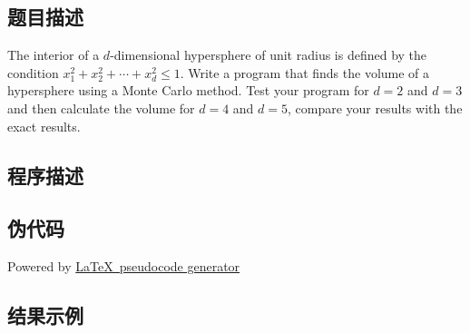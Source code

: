 \subsection{题目描述}
\noindent
The interior of a $d$-dimensional hypersphere of unit radius is defined by the condition
$x_1^2 + x_2^2 + \cdots + x_d^2 \leq 1$. Write a program that finds the volume of a hypersphere
using a Monte Carlo method. Test your program for $d=2$ and $d=3$ and then calculate the volume
for $d=4$ and $d=5$, compare your results with the exact results.


\subsection{程序描述}

\subsection{伪代码}
Powered by \href{https://chatgpt.com/g/g-xJJAA2awf-latex-pseudocode-generator}{\LaTeX \ pseudocode generator}


\subsection{结果示例}

